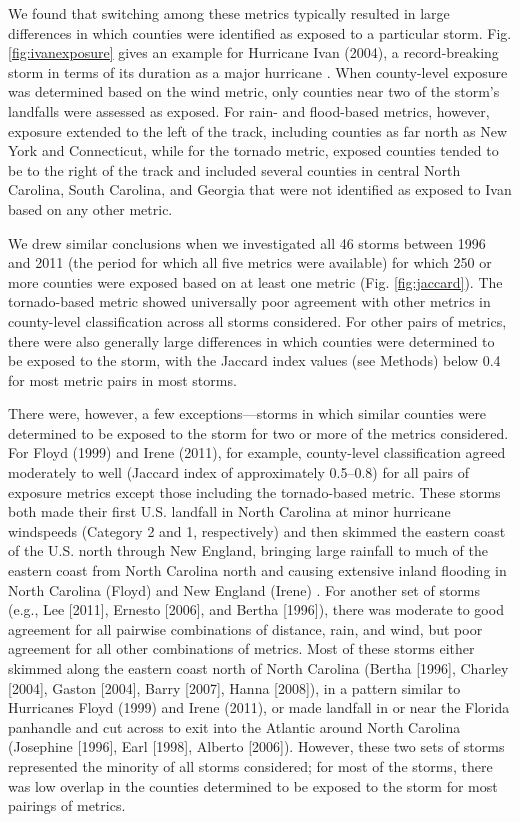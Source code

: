\documentclass[fleqn,10pt,lineno]{olplainarticle}
\begin{document}
We found that switching among these metrics typically resulted in large
differences in which counties were identified as exposed to a particular storm.
Fig. \ref{fig:ivanexposure} gives an example for Hurricane Ivan (2004), a
record-breaking storm in terms of its duration as a major hurricane
\citep{franklin2006atlantic}. When county-level exposure was determined based on
the wind metric, only counties near two of the storm's landfalls were assessed
as exposed. For rain- and flood-based metrics, however, exposure extended to the
left of the track, including counties as far north as New York and Connecticut,
while for the tornado metric, exposed counties tended to be to the right of the
track and included several counties in central North Carolina, South Carolina,
and Georgia that were not identified as exposed to Ivan based on any other
metric.

We drew similar conclusions when we investigated all 46 storms between 1996 and
2011 (the period for which all five metrics were available) for which 250 or
more counties were exposed based on at least one metric (Fig.
\ref{fig:jaccard}). The tornado-based metric showed universally poor agreement
with other metrics in county-level classification across all storms considered.
For other pairs of metrics, there were also generally large differences in
which counties were determined to be exposed to the storm, with the Jaccard
index values (see Methods) below 0.4 for most metric pairs in most storms.

There were, however, a few exceptions---storms in which similar counties were
determined to be exposed to the storm for two or more of the metrics
considered.  For Floyd (1999) and Irene (2011), for example, county-level
classification agreed moderately to well (Jaccard index of approximately
0.5--0.8) for all pairs of exposure metrics except those including the
tornado-based metric. These storms both made their first U.S. landfall in North
Carolina at minor hurricane windspeeds (Category 2 and 1, respectively) and
then skimmed the eastern coast of the U.S. north through New England, bringing
large rainfall to much of the eastern coast from North Carolina north and
causing extensive inland flooding in North Carolina (Floyd) and New England
(Irene) \citep{avila2013atlantic, lawrence2000atlantic}. For another set of
storms (e.g., Lee [2011], Ernesto [2006], and Bertha [1996]), there was
moderate to good agreement for all pairwise combinations of distance, rain, and
wind, but poor agreement for all other combinations of metrics. Most of these
storms either skimmed along the eastern coast north of North Carolina (Bertha
[1996], Charley [2004], Gaston [2004], Barry [2007], Hanna [2008]), in a
pattern similar to Hurricanes Floyd (1999) and Irene (2011), or made landfall
in or near the Florida panhandle and cut across to exit into the Atlantic
around North Carolina (Josephine [1996], Earl [1998], Alberto [2006]). However,
these two sets of storms represented the minority of all storms considered; for
most of the storms, there was low overlap in the counties determined to be
exposed to the storm for most pairings of metrics.
\end{document}
